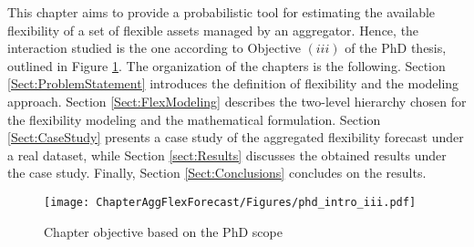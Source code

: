 This chapter aims to provide a probabilistic tool for estimating the available flexibility of a set of flexible assets managed by an aggregator. Hence, the interaction studied is the one according to Objective $(iii)$ of the PhD thesis, outlined in Figure \ref{fig:chapter_obj_iii}. The organization of the chapters is the following. Section \ref{Sect:ProblemStatement} introduces the definition of flexibility and the modeling approach. Section \ref{Sect:FlexModeling} describes the two-level hierarchy chosen for the flexibility modeling and the mathematical formulation. Section \ref{Sect:CaseStudy} presents a case study of the aggregated flexibility forecast under a real dataset, while Section \ref{sect:Results} discusses the obtained results under the case study. Finally, Section \ref{Sect:Conclusions} concludes on the results.

\begin{figure}[h]
	\centering
	\texttt{[image: ChapterAggFlexForecast/Figures/phd\_intro\_iii.pdf]}
		\caption{Chapter objective based on the PhD scope}
	\label{fig:chapter_obj_iii}  
\end{figure}

